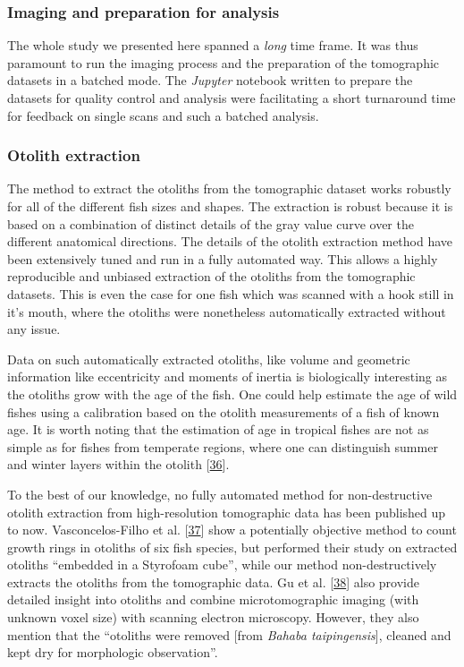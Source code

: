 \hypertarget{imaging-and-preparation-for-analysis}{%
\subsubsection{Imaging and preparation for analysis}\label{imaging-and-preparation-for-analysis}}

The whole study we presented here spanned a \emph{long} time frame.
It was thus paramount to run the imaging process and the preparation of the tomographic datasets in a batched mode.
The \emph{Jupyter} notebook written to prepare the datasets for quality control and analysis were facilitating a short turnaround time for feedback on single scans and such a batched analysis.

\hypertarget{otolith-extraction}{%
\subsubsection{Otolith extraction}\label{otolith-extraction}}

The method to extract the otoliths from the tomographic dataset works robustly for all of the different fish sizes and shapes.
The extraction is robust because it is based on a combination of distinct details of the gray value curve over the different anatomical directions.
The details of the otolith extraction method have been extensively tuned and run in a fully automated way.
This allows a highly reproducible and unbiased extraction of the otoliths from the tomographic datasets.
This is even the case for one fish which was scanned with a hook still in it's mouth, where the otoliths were nonetheless automatically extracted without any issue.

Data on such automatically extracted otoliths, like volume and geometric information like eccentricity and moments of inertia is biologically interesting as the otoliths grow with the age of the fish.
One could help estimate the age of wild fishes using a calibration based on the otolith measurements of a fish of known age.
It is worth noting that the estimation of age in tropical fishes are not as simple as for fishes from temperate regions, where one can distinguish summer and winter layers within the otolith {[}\protect\hyperlink{ref-Iy1X7kEU}{36}{]}.

To the best of our knowledge, no fully automated method for non-destructive otolith extraction from high-resolution tomographic data has been published up to now.
Vasconcelos-Filho et al. {[}\protect\hyperlink{ref-PgMc4mCy}{37}{]} show a potentially objective method to count growth rings in otoliths of six fish species, but performed their study on extracted otoliths ``embedded in a Styrofoam cube'', while our method non-destructively extracts the otoliths from the tomographic data.
Gu et al. {[}\protect\hyperlink{ref-HYXdLQTV}{38}{]} also provide detailed insight into otoliths and combine microtomographic imaging (with unknown voxel size) with scanning electron microscopy.
However, they also mention that the ``otoliths were removed {[}from \emph{Bahaba taipingensis}{]}, cleaned and kept dry for morphologic observation''.

